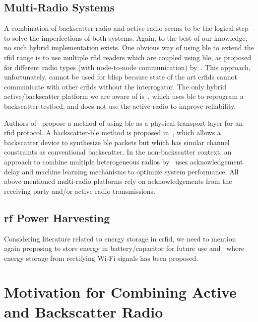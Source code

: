 \documentclass[conference,letterpaper,twoside,final,10pt]{IEEEtran}
\begin{document}
\subsection{Multi-Radio Systems}
\label{sec:related_work/multi}

A combination of backscatter radio and active radio seems to be the logical step to solve the imperfections of both systems.
Again, to the best of our knowledge, no such hybrid implementation exists. 
One obvious way of using \ac{ble} to extend the \ac{rfid} range is to use multiple \ac{rfid} readers which are coupled using \ac{ble}, as proposed for different radio types (with node-to-node communication) by~\cite{islam2014access}.
This approach, unfortunately, cannot be used for \ac{blisp} because state of the art \ac{crfid}s cannot communicate with other \ac{crfid}s without the interrogator.
The only hybrid active/backscatter platform we are aware of is~\cite{kampianakis2014real}, which uses \ac{ble} to reprogram a backscatter testbed, and does not use the active radio to improve reliability.

Authors of~\cite{brideglall2007symbol} propose a method of using \ac{ble} as a physical transport layer for an \acs{rfid} protocol.
A backscatter-\acs{ble} method is proposed in~\cite{ensworth2015rfid}, which allows a backscatter device to synthesize \acs{ble} packets but which has similar channel constraints as conventional backscatter.
In the non-backscatter context, an approach to combine multiple heterogeneous radios by~\cite{gummeson2010jsac} uses acknowledgement delay and machine learning mechanisms to optimize system performance.
All above-mentioned multi-radio platforms rely on acknowledgements from the receiving party and/or active radio transmissions.

\subsection{\ac{rf} Power Harvesting}
\label{sec:related_work/harvester}

Considering literature related to energy storage in \ac{crfid},
we need to mention \cite{dong2015rfid} again proposing to store energy in battery/capacitor for future use and~\cite{talla2015arxiv} where energy storage from rectifying Wi-Fi signals has been proposed.

\section{Motivation for Combining Active and Backscatter Radio}
\label{sec:motivation}
\end{document}
